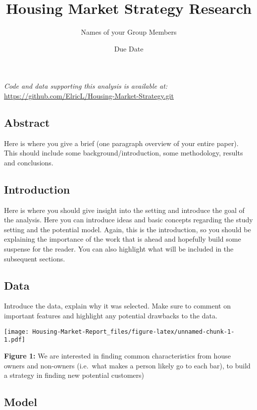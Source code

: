 \documentclass[
]{article}
\title{Housing Market Strategy Research}
\author{Names of your Group Members}
\date{Due Date}
\begin{document}
\maketitle

\emph{Code and data supporting this analysis is available at:}\\
\url{https://github.com/ElricL/Housing-Market-Strategy.git}

\hypertarget{abstract}{%
\subsection{Abstract}\label{abstract}}

Here is where you give a brief (one paragraph overview of your entire
paper). This should include some background/introduction, some
methodology, results and conclusions.

\hypertarget{introduction}{%
\subsection{Introduction}\label{introduction}}

Here is where you should give insight into the setting and introduce the
goal of the analysis. Here you can introduce ideas and basic concepts
regarding the study setting and the potential model. Again, this is the
introduction, so you should be explaining the importance of the work
that is ahead and hopefully build some suspense for the reader. You can
also highlight what will be included in the subsequent sections.

\hypertarget{data}{%
\subsection{Data}\label{data}}

Introduce the data, explain why it was selected. Make sure to comment on
important features and highlight any potential drawbacks to the data.

\texttt{[image: Housing-Market-Report\_files/figure-latex/unnamed-chunk-1-1.pdf]}

\textbf{Figure 1:} We are interested in finding common characteristics
from house owners and non-owners (i.e.~what makes a person likely go to
each bar), to build a strategy in finding new potential customers)

\hypertarget{model}{%
\subsection{Model}\label{model}}
\end{document}
